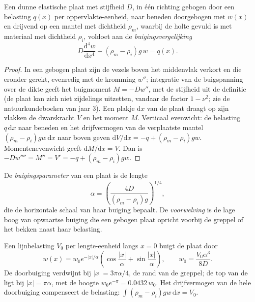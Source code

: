 \begin{theorem}\label{thm:b3:gravity-geodesy:plate}
Een dunne elastische plaat met stijfheid $D$, in één richting gebogen door een belasting $q(x)$
per oppervlakte-eenheid, naar beneden doorgebogen met $w(x)$ en drijvend op een mantel met dichtheid
$\rho_m$, waarbij de holte gevuld is met materiaal met dichtheid $\rho_i$, voldoet aan de
\emph{buigingsvergelijking}
\[
  D\frac{\mathrm d^4w}{\mathrm dx^4} + (\rho_m - \rho_i)g\,w = q(x) .
\]
\end{theorem}

\begin{proof}
In een gebogen plaat zijn de vezels boven het middenvlak verkort en die eronder
gerekt, evenredig met de kromming $w''$; integratie van de buigspanning
over de dikte geeft het buigmoment $M = -Dw''$, met de
stijfheid uit de definitie (de plaat kan zich niet zijdelings uitzetten, vandaar de factor
$1 - \nu^2$; zie de natuurkundeboeken van jaar 3). Een plakje $\mathrm dx$ van de plaat
draagt op zijn vlakken de dwarskracht $V$ en het moment $M$. Verticaal evenwicht:
de belasting $q\,\mathrm dx$ naar beneden en het drijfvermogen van de verplaatste mantel
$(\rho_m - \rho_i)gw\,\mathrm dx$ naar boven geven $\mathrm dV/\mathrm dx = -q +
(\rho_m - \rho_i)gw$. Momentenevenwicht geeft $\mathrm dM/\mathrm dx = V$.
Dan is $-Dw'''' = M'' = V' = -q + (\rho_m - \rho_i)gw$.
\end{proof}

\begin{definition}\label{def:b3:gravity-geodesy:alpha}
De \emph{buigingsparameter} van een plaat is de
lengte
\[
  \alpha = \left(\frac{4D}{(\rho_m - \rho_i)g}\right)^{1/4},
\]
die de horizontale schaal van haar buiging bepaalt. De \emph{voorwelving}
is de lage boog van opwaartse buiging die een gebogen plaat opricht voorbij de greppel of het
bekken naast haar belasting.
\end{definition}

\begin{proposition}\label{prop:b3:gravity-geodesy:line}
Een lijnbelasting $V_0$ per lengte-eenheid langs $x = 0$ buigt de plaat door
\[
  w(x) = w_0e^{-|x|/\alpha}\left(\cos\frac{|x|}{\alpha} + \sin\frac{|x|}{\alpha}\right),
  \qquad w_0 = \frac{V_0\alpha^3}{8D} .
\]
De doorbuiging verdwijnt bij $|x| = 3\pi\alpha/4$, de rand van de greppel; de
top van de  ligt bij $|x| = \pi\alpha$, met de hoogte $w_0e^{-\pi} =
\num{0.0432}\,w_0$. Het drijfvermogen van de hele doorbuiging compenseert de belasting:
$\int(\rho_m - \rho_i)gw\,\mathrm dx = V_0$.
\end{proposition}

